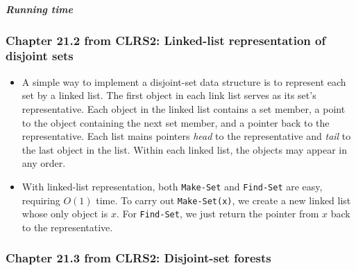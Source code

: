 \documentclass[a4paper,11pt]{article}
\begin{document}
\subparagraph{Running time}\label{running-time-1}

\subsubsection{Chapter 21.2 from CLRS2: Linked-list representation of
disjoint
sets}\label{chapter-21.2-from-clrs2-linked-list-representation-of-disjoint-sets}

\begin{itemize}
\item
  A simple way to implement a disjoint-set data structure is to
  represent each set by a linked list. The first object in each link
  list serves as its set's representative. Each object in the linked
  list contains a set member, a point to the object containing the next
  set member, and a pointer back to the representative. Each list mains
  pointers \emph{head} to the representative and \emph{tail} to the last
  object in the list. Within each linked list, the objects may appear in
  any order.
\item
  With linked-list representation, both \texttt{Make-Set} and
  \texttt{Find-Set} are easy, requiring $O(1)$ time. To carry out
  \texttt{Make-Set(x)}, we create a new linked list whose only object is
  $x$. For \texttt{Find-Set}, we just return the pointer from $x$ back
  to the representative.
\end{itemize}

\subsubsection{Chapter 21.3 from CLRS2: Disjoint-set
forests}\label{chapter-21.3-from-clrs2-disjoint-set-forests}
\end{document}
